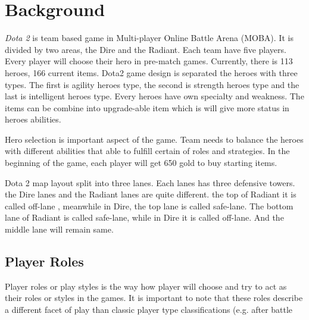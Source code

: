\section{Background}
\label{sec:background}

\textit{Dota 2} is team based game in Multi-player Online Battle Arena (MOBA). It is divided by two areas, the Dire and the Radiant. Each team have five players. Every player will choose their hero in pre-match games. Currently, there is 113 heroes, 166 current items. Dota2 game design is separated the heroes with three types. The first is agility heroes type, the second is strength heroes type and the last is intelligent heroes type. Every heroes have own specialty and weakness. The items can be combine into upgrade-able item which is will give more status in heroes abilities.

Hero selection is important aspect of the game. Team needs to balance the heroes with different abilities that able to fulfill certain of roles and strategies. In the beginning of the game, each player will get 650 gold to buy starting items.

Dota 2 map layout split into three lanes. Each lanes has three defensive towers. the Dire lanes and the Radiant lanes are quite different. the top of Radiant it is called off-lane , meanwhile in Dire, the top lane is called safe-lane. The bottom lane of Radiant is called safe-lane, while in Dire it is called off-lane. And the middle lane will remain same.

\subsection{Player Roles}
\label{sec:player_roles}

Player roles or play styles is the way how player will choose and try to act as their roles or styles in the games. It is important to note that these roles describe a different facet of play than classic player type classifications (e.g. after battle
